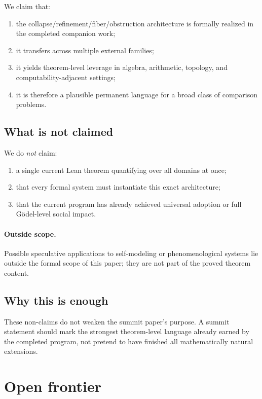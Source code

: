 \documentclass[11pt]{article}
\begin{document}
We claim that:
\begin{enumerate}[label=(\arabic*)]
  \item the collapse/refinement/fiber/obstruction architecture is formally realized
    in the completed companion work;
  \item it transfers across multiple external families;
  \item it yields theorem-level leverage in algebra, arithmetic, topology, and
    computability-adjacent settings;
  \item it is therefore a plausible permanent language for a broad class of
    comparison problems.
\end{enumerate}

\subsection{What is not claimed}

We do \emph{not} claim:
\begin{enumerate}[label=(\arabic*)]
  \item a single current Lean theorem quantifying over all domains at once;
  \item that every formal system must instantiate this exact architecture;
  \item that the current program has already achieved universal adoption or full
    G\"odel-level social impact.
\end{enumerate}

\paragraph{Outside scope.}
Possible speculative applications to self-modeling or phenomenological systems lie outside
the formal scope of this paper; they are not part of the proved theorem content.

\subsection{Why this is enough}

These non-claims do not weaken the summit paper's purpose. A summit statement
should mark the strongest theorem-level language already earned by the completed
program, not pretend to have finished all mathematically natural extensions.

\section{Open frontier}\label{sec:frontier}
\end{document}
